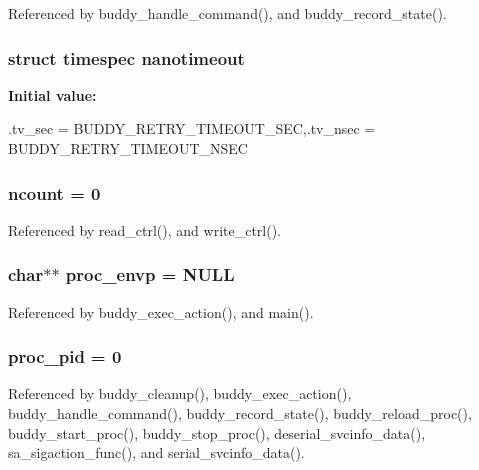 Referenced by buddy\_\-handle\_\-command(), and buddy\_\-record\_\-state().

\subsubsection[{nanotimeout}]{\setlength{\rightskip}{0pt plus 5cm}struct {\bf timespec} {\bf nanotimeout}\hspace{0.3cm}{\ttfamily  [static]}}\label{buddy_8c_a0aa2ef11dabd8b068b1725e8a94c92cb}
{\bfseries Initial value:}
\begin{DoxyCode}
 {.tv_sec = BUDDY_RETRY_TIMEOUT_SEC,.tv_nsec =
        BUDDY_RETRY_TIMEOUT_NSEC }
\end{DoxyCode}
\subsubsection[{ncount}]{ {\bf ncount} = 0\hspace{0.3cm}{\ttfamily  [static]}}\label{buddy_8c_af750bbadf6e7e222f8d8b062e8696dd0}


Referenced by read\_\-ctrl(), and write\_\-ctrl().

\subsubsection[{proc\_\-envp}]{\setlength{\rightskip}{0pt plus 5cm}char$\ast$$\ast$ {\bf proc\_\-envp} = NULL}\label{buddy_8c_adcfeefdfcc71ba2dc2cddac18f4dcb4d}


Referenced by buddy\_\-exec\_\-action(), and main().

\subsubsection[{proc\_\-pid}]{ {\bf proc\_\-pid} = 0\hspace{0.3cm}{\ttfamily  [static]}}\label{buddy_8c_aa13c9951e918940d6f11d8ea9c2f4546}


Referenced by buddy\_\-cleanup(), buddy\_\-exec\_\-action(), buddy\_\-handle\_\-command(), buddy\_\-record\_\-state(), buddy\_\-reload\_\-proc(), buddy\_\-start\_\-proc(), buddy\_\-stop\_\-proc(), deserial\_\-svcinfo\_\-data(), sa\_\-sigaction\_\-func(), and serial\_\-svcinfo\_\-data().


